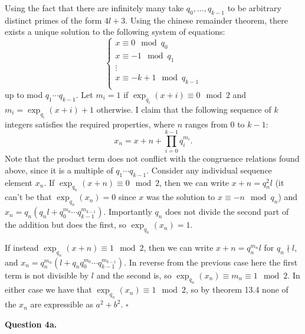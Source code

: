 \documentclass[letterpaper, reqno,11pt]{article}
\begin{document}
Using the fact that there are infinitely many take $q_0,\ldots, q_{k-1}$ to be arbitrary distinct primes of the form $4l+3$. Using the chinese remainder theorem, there exists a unique solution to the following system of equations:
\[
\begin{cases}
    
x\equiv 0\mod q_0\\
x\equiv -1\mod q_1\\
\vdots\\
x\equiv -k+1\mod q_{k-1}\\
\end{cases}
\]
up to mod $q_1\cdots q_{k-1}$. Let $m_i=1$ if $\exp_{q_i}(x+i)\equiv 0\mod 2$ and $m_i=\exp_{q_i}(x+i)+1$ otherwise. I claim that the following sequence of $k$ integers satisfies the required properties, where $n$ ranges from 0 to $k-1$:
\[
    x_n=x+n+\prod_{i=0}^{k-1}q_i^{m_i}
.\]
Note that the product term does not conflict with the congruence relations found above, since it is a multiple of $q_1\cdots q_{k-1}$. Consider any individual sequence element $x_n$. If $\exp_{q_{n}}(x+n)\equiv 0\mod 2$, then we can write $x+n=q_n^2l$ (it can't be that $\exp_{q_n}(x_n)=0$ since $x$ was the solution to $x\equiv -n\mod q_n$) and $x_n=q_n(q_nl+q_0^{m_0}\cdots q_{k-1}^{m_{k-1}})$. Importantly $q_n$ does not divide the second part of the addition but does the first, so $\exp_{q_n}(x_n)=1$.

If instead $\exp_{q_{n}}(x+n)\equiv 1\mod 2$, then we can write $x+n=q_n^{m_n}l$ for $q_n\nmid l$, and $x_n=q_n^{m_n}(l+q_nq_0^{m_0}\cdots q_{k-1}^{m_{k-1}})$. In reverse from the previous case here the first term is not divisible by $l$ and the second is, so $\exp_{q_n}(x_n)\equiv m_n\equiv 1\mod 2$. In either case we have that $\exp_{q_n}(x_n)\equiv 1\mod 2$, so by theorem 13.4 none of the $x_n$ are expressible as $a^2+b^2$. $\square$

{\medskip\noindent\bf Question 4a.} 
\end{document}
